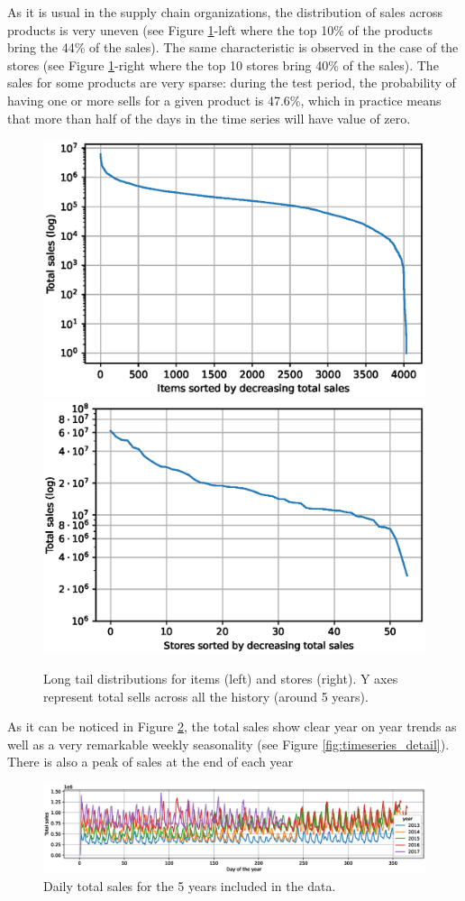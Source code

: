 As it is usual in the supply chain organizations, the distribution of sales across products is very uneven (see Figure \ref{fig:tails}-left where the top 10\% of the products bring the 44\% of the sales). The same characteristic is observed in the case of the stores (see Figure \ref{fig:tails}-right where the top 10 stores bring 40\% of the sales). The sales for some products are very sparse: during the test period, the probability of having one or more sells for a given product is 47.6\%, which in practice means that more than half of the days in the time series will have value of zero.

\begin{figure}
	\centering
	\includegraphics[width=0.48\linewidth]{salesforecast/images/items_tail_log}
	\includegraphics[width=0.48\linewidth]{salesforecast/images/stores_tail_log}
	\caption{Long tail distributions for items (left) and stores (right). Y axes represent total sells across all the history (around 5 years).}
	\label{fig:tails}
\end{figure}

As it can be noticed in Figure \ref{fig:timeseries}, the total sales show clear year on year trends as well as a very remarkable weekly seasonality (see Figure \ref{fig:timeseries_detail}). There is also a peak of sales at the end of each year

 	\begin{figure}
 	\centering
 	\includegraphics[width=1\textwidth]{salesforecast/images/timeseries}
 	\caption{Daily total sales for the 5 years included in the data.}
 	\label{fig:timeseries}
\end{figure}

